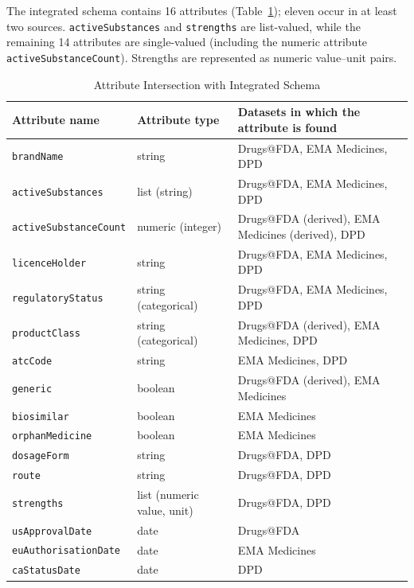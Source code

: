 \documentclass[a4paper,oneside]{scrbook}
\begin{document}
The integrated schema contains 16 attributes (Table~\ref{tab:schema}); eleven occur in at
least two sources. \texttt{activeSubstances} and \texttt{strengths} are list-valued, while
the remaining 14 attributes are single-valued (including the numeric attribute
\texttt{activeSubstanceCount}). Strengths are represented as numeric value--unit pairs.

\begin{table}[htbp]
\centering
\caption{Attribute Intersection with Integrated Schema}
\label{tab:schema}
\small
\begin{tabular}{|l|l|>{\raggedright\arraybackslash}p{6cm}|}
\hline
\textbf{Attribute name} & \textbf{Attribute type} & \textbf{Datasets in which the attribute is found} \\
\hline
\texttt{brandName} & string & Drugs@FDA, EMA Medicines, DPD \\
\texttt{activeSubstances} & list (string) & Drugs@FDA, EMA Medicines, DPD \\
\texttt{activeSubstanceCount} & numeric (integer) & Drugs@FDA (derived), EMA Medicines (derived), DPD \\
\texttt{licenceHolder} & string & Drugs@FDA, EMA Medicines, DPD \\
\texttt{regulatoryStatus} & string (categorical) & Drugs@FDA, EMA Medicines, DPD \\
\texttt{productClass} & string (categorical) & Drugs@FDA (derived), EMA Medicines, DPD \\
\texttt{atcCode} & string & EMA Medicines, DPD \\
\texttt{generic} & boolean & Drugs@FDA (derived), EMA Medicines \\
\texttt{biosimilar} & boolean & EMA Medicines \\
\texttt{orphanMedicine} & boolean & EMA Medicines \\
\texttt{dosageForm} & string & Drugs@FDA, DPD \\
\texttt{route} & string & Drugs@FDA, DPD \\
\texttt{strengths} & list (numeric value, unit) & Drugs@FDA, DPD \\
\texttt{usApprovalDate} & date & Drugs@FDA \\
\texttt{euAuthorisationDate} & date & EMA Medicines \\
\texttt{caStatusDate} & date & DPD \\
\hline
\end{tabular}
\end{table}
\end{document}
